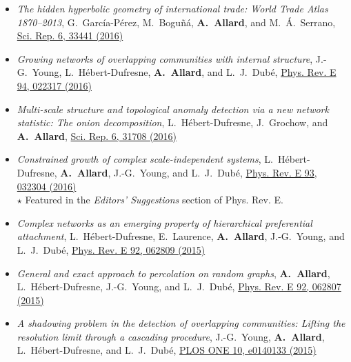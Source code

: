 \documentclass[11pt]{article}
\begin{document}
\begin{itemize}
%
  \item \textit{The hidden hyperbolic geometry of international trade: World Trade Atlas 1870--2013}, G.~Garc\'ia-P\'erez, M.~Bogu\~n\'a, \textbf{A.~Allard}, and M.~\'A.~Serrano, \href{http://dx.doi.org/10.1038/srep33441}{Sci. Rep. 6, 33441 (2016)}%
%
  \item \textit{Growing networks of overlapping communities with internal structure}, J.-G.~Young, L.~H\'ebert-Dufresne, \textbf{A.~Allard}, and L.~J.~Dub\'e, \href{http://dx.doi.org/10.1103/PhysRevE.94.022317}{Phys. Rev. E 94, 022317 (2016)}%
%
  \item \textit{Multi-scale structure and topological anomaly detection via a new network statistic: The onion decomposition}, L.~H\'ebert-Dufresne, J.~Grochow, and \textbf{A.~Allard}, \href{http://dx.doi.org/10.1038/srep31708}{Sci. Rep. 6, 31708 (2016)}%
%
  \item \textit{Constrained growth of complex scale-independent systems}, L.~H\'ebert-Dufresne, \textbf{A.~Allard}, J.-G.~Young, and L.~J.~Dub\'e, \href{http://dx.doi.org/10.1103/PhysRevE.93.032304}{Phys. Rev. E 93, 032304 (2016)}\\%
  {\footnotesize $\star$ Featured in the \textit{Editors' Suggestions} section of Phys. Rev. E.}
%
  \item \textit{Complex networks as an emerging property of hierarchical preferential attachment}, L.~H\'ebert-Dufresne, E.~Laurence, \textbf{A.~Allard}, J.-G.~Young, and L.~J.~Dub\'e, \href{http://dx.doi.org/10.1103/PhysRevE.92.062809}{Phys. Rev. E 92, 062809 (2015)}%
%
  \item \textit{General and exact approach to percolation on random graphs}, \textbf{A.~Allard}, L.~H\'ebert-Dufresne, J.-G.~Young, and L.~J.~Dub\'e, \href{http://dx.doi.org/10.1103/PhysRevE.92.062807}{Phys. Rev. E 92, 062807 (2015)}%
%
  \item \textit{A shadowing problem in the detection of overlapping communities: Lifting the resolution limit through a cascading procedure}, J.-G.~Young, \textbf{A.~Allard}, L.~H\'ebert-Dufresne, and L.~J.~Dub\'e, \href{http://dx.doi.org/10.1371/journal.pone.0140133}{PLOS ONE 10, e0140133 (2015)}%

\end{itemize}
\end{document}
